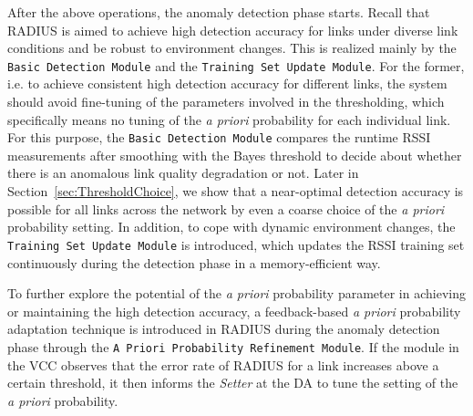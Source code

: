 After the above operations, the anomaly detection phase starts. Recall that RADIUS is aimed to achieve high detection accuracy for links under diverse link conditions and be robust to environment changes. This is realized mainly by the \texttt{Basic Detection Module} and the \texttt{Training Set Update Module}. For the former, i.e. to achieve consistent high detection accuracy for different links, the system should avoid fine-tuning of the parameters involved in the thresholding, which specifically means no tuning of the \textit{a priori} probability for each individual link. For this purpose, the \texttt{Basic Detection Module} compares the runtime RSSI measurements after smoothing with the Bayes threshold to decide about whether there is an anomalous link quality degradation or not. Later in Section~\ref{sec:ThresholdChoice}, we show that a near-optimal detection accuracy is possible for all links across the network by even a coarse choice of the \textit{a priori} probability setting. In addition, to cope with dynamic environment changes, the \texttt{Training Set Update Module} is introduced, which updates the RSSI training set continuously during the detection phase in a memory-efficient way.



To further explore the potential of the \textit{a priori} probability parameter in achieving or maintaining the high detection accuracy, a feedback-based \textit{a priori} probability adaptation technique is introduced in RADIUS during the anomaly detection phase through the \texttt{A Priori Probability Refinement Module}. If the module in the VCC observes that the error rate of RADIUS for a link increases above a certain threshold, it then informs the \textit{Setter} at the DA to tune the setting of the \textit{a priori} probability.



